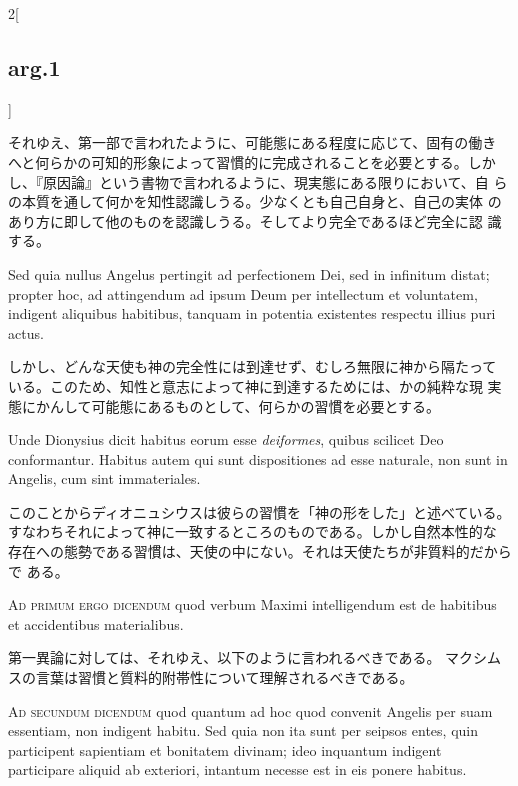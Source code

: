 \documentclass[paper=a4paper,fontsize=10pt,jafontsize=9pt,titlepage]{jlreq}
\begin{document}
\begin{paracol}{2}[\subsection{arg.1}]
\switchcolumn

それゆえ、第一部で言われたように、可能態にある程度に応じて、固有の働き
へと何らかの可知的形象によって習慣的に完成されることを必要とする。しか
し、『原因論』という書物で言われるように、現実態にある限りにおいて、自
らの本質を通して何かを知性認識しうる。少なくとも自己自身と、自己の実体
のあり方に即して他のものを認識しうる。そしてより完全であるほど完全に認
識する。

\switchcolumn*

Sed quia nullus Angelus pertingit ad perfectionem Dei, sed in
infinitum distat; propter hoc, ad attingendum ad ipsum Deum per
intellectum et voluntatem, indigent aliquibus habitibus, tanquam in
potentia existentes respectu illius puri actus.

\switchcolumn

しかし、どんな天使も神の完全性には到達せず、むしろ無限に神から隔たって
 いる。このため、知性と意志によって神に到達するためには、かの純粋な現
 実態にかんして可能態にあるものとして、何らかの習慣を必要とする。

\switchcolumn*

Unde Dionysius dicit habitus eorum esse {\itshape deiformes}, quibus
 scilicet Deo conformantur. Habitus autem qui sunt dispositiones ad
 esse naturale, non sunt in Angelis, cum sint immateriales.

\switchcolumn

このことからディオニュシウスは彼らの習慣を「神の形をした」と述べている。
すなわちそれによって神に一致するところのものである。しかし自然本性的な
 存在への態勢である習慣は、天使の中にない。それは天使たちが非質料的だからで
 ある。

\switchcolumn*[\subsection{ad.1}]

{\scshape Ad primum ergo dicendum} quod verbum Maximi intelligendum est de
 habitibus et accidentibus materialibus.

\switchcolumn

第一異論に対しては、それゆえ、以下のように言われるべきである。
マクシムスの言葉は習慣と質料的附帯性について理解されるべきである。

\switchcolumn*[\subsection{ad.2}]

{\scshape Ad secundum dicendum} quod quantum ad hoc quod convenit Angelis per
 suam essentiam, non indigent habitu. Sed quia non ita sunt per
 seipsos entes, quin participent sapientiam et bonitatem divinam; ideo
 inquantum indigent participare aliquid ab exteriori, intantum necesse
 est in eis ponere habitus.


\end{paracol}
\end{document}
